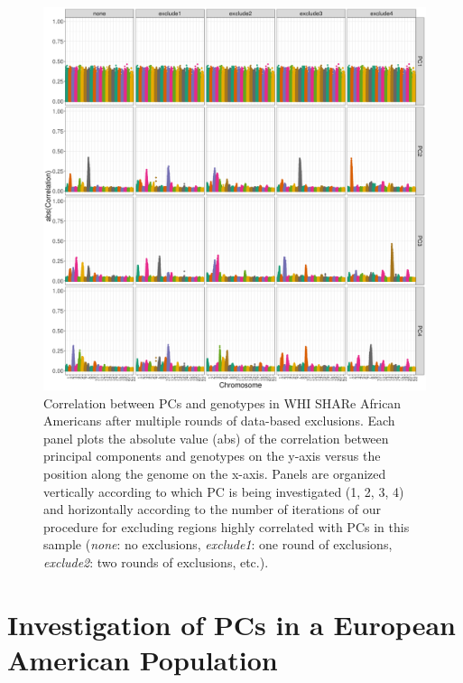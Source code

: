 \documentclass[12pt]{article}
\begin{document}
\begin{figure}
\center
\includegraphics[width=\textwidth]{figs/finalfigs/figS5_pc_geno_corr_compare_exclude}
\caption[Correlation between PCs and genotypes using a data-based filtering process.]{Correlation between PCs and genotypes in WHI SHARe African Americans after multiple rounds of data-based exclusions. Each panel plots the absolute value (abs) of the correlation between principal components and genotypes on the y-axis versus the position along the genome on the x-axis.  Panels are organized vertically according to which PC is being investigated (1, 2, 3, 4) and horizontally according to the number of iterations of our procedure for excluding regions highly correlated with PCs in this sample (\textit{none}: no exclusions, \textit{exclude1}: one round of exclusions, \textit{exclude2}: two rounds of exclusions, etc.).}
\label{fig:corr-compare-exclude}
\end{figure}



\newpage
\section{Investigation of PCs in a European American Population}
\end{document}
